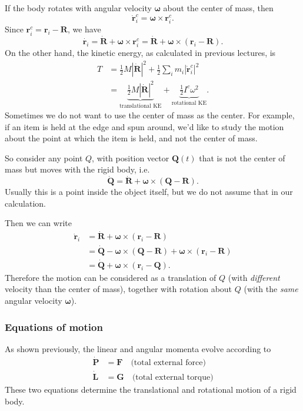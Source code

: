 \documentclass[a4paper]{article}
\begin{document}
If the body rotates with angular velocity $\boldsymbol\omega$ about the center of mass, then
\[
  \dot{\mathbf{r}}_i^c = \boldsymbol\omega \times \mathbf{r}_i^c.
\]
Since $\mathbf{r}_i^c = \mathbf{r}_i - \mathbf{R}$, we have
\[
  \dot{\mathbf{r}_i} = \dot{\mathbf{R}} + \boldsymbol \omega \times \mathbf{r}_i^c = \dot{\mathbf{R}} + \boldsymbol\omega\times (\mathbf{r}_i - \mathbf{R}).
\]
On the other hand, the kinetic energy, as calculated in previous lectures, is
\begin{align*}
  T &= \frac{1}{2}M|\dot{\mathbf{R}}|^2 + \frac{1}{2}\sum_i m_i |\dot{\mathbf{r}}_i^c|^2\\
  &= \underbrace{\frac{1}{2}M|\dot{\mathbf{R}}|^2}_{\text{translational KE}} + \underbrace{\frac{1}{2}I^c\omega^2}_{\text{rotational KE}}.
\end{align*}
Sometimes we do not want to use the center of mass as the center. For example, if an item is held at the edge and spun around, we'd like to study the motion about the point at which the item is held, and not the center of mass.

So consider any point $Q$, with position vector $\mathbf{Q}(t)$ that is not the center of mass but moves with the rigid body, i.e.
\[
  \dot{\mathbf{Q}} = \dot{\mathbf{R}} + \boldsymbol\omega\times (\mathbf{Q} - \mathbf{R}).
\]
Usually this is a point inside the object itself, but we do not assume that in our calculation.

Then we can write
\begin{align*}
  \dot{\mathbf{r}}_i &= \dot{\mathbf{R}} + \boldsymbol\omega\times (\mathbf{r}_i - \mathbf{R})\\
  &= \dot{\mathbf{Q}} - \boldsymbol\omega\times (\mathbf{Q} - \mathbf{R}) + \boldsymbol\omega \times (\mathbf{r}_i - \mathbf{R})\\
  &= \dot{\mathbf{Q}} + \boldsymbol\omega\times (\mathbf{r}_i - \mathbf{Q}).
\end{align*}
Therefore the motion can be considered as a translation of $Q$ (with \emph{different} velocity than the center of mass), together with rotation about $Q$ (with the \emph{same} angular velocity $\boldsymbol\omega$).

\subsubsection*{Equations of motion}
As shown previously, the linear and angular momenta evolve according to
\begin{align*}
  \dot{\mathbf{P}} &= \mathbf{F}\quad \text{(total external force)}\\
  \dot{\mathbf{L}} &= \mathbf{G}\quad \text{(total external torque)}
\end{align*}
These two equations determine the translational and rotational motion of a rigid body.
\end{document}
